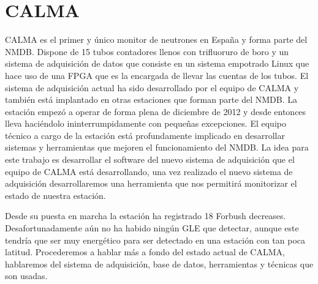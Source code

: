 \section{CALMA}
	CALMA\cite{Medina2013} es el primer y único monitor de neutrones en España y forma parte del NMDB. Dispone de 15 tubos contadores llenos con
	trifluoruro de boro y un sistema de adquisición de datos que consiste en un sistema empotrado Linux que hace uso de una FPGA que es la
	encargada de llevar las cuentas de los tubos. El sistema de adquisición actual ha sido desarrollado por el equipo de CALMA y también está
	implantado en otras estaciones que forman parte del NMDB. La estación empezó a operar de forma plena de diciembre de 2012 y desde entonces
	lleva haciéndolo ininterrumpidamente con pequeñas excepciones. El equipo técnico a cargo de la estación está profundamente implicado en
	desarrollar sistemas y herramientas que mejoren el funcionamiento del NMDB. La idea para este trabajo es desarrollar el software del nuevo
	sistema de adquisición que el equipo de CALMA está desarrollando, una vez realizado el nuevo sistema de adquisición desarrollaremos una
	herramienta que nos permitirá monitorizar el estado de nuestra estación.
	\par
	Desde su puesta en marcha la estación ha registrado 18 Forbush decreases. Desafortunadamente aún no ha habido ningún GLE que detectar, aunque
	este tendría que ser muy energético para ser detectado en una estación con tan poca latitud.  Procederemos a hablar más a fondo del estado
	actual de CALMA, hablaremos del sistema de adquisición, base de datos, herramientas y técnicas que son usadas.
